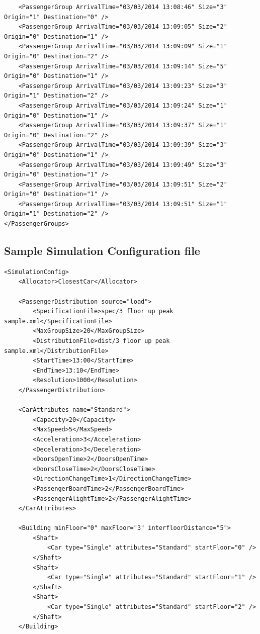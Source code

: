 \documentclass{UoYCSproject}
\begin{document}
\begin{appendices}
\begin{lstlisting}
	<PassengerGroup ArrivalTime="03/03/2014 13:08:46" Size="3" Origin="1" Destination="0" />
	<PassengerGroup ArrivalTime="03/03/2014 13:09:05" Size="2" Origin="0" Destination="1" />
	<PassengerGroup ArrivalTime="03/03/2014 13:09:09" Size="1" Origin="0" Destination="2" />
	<PassengerGroup ArrivalTime="03/03/2014 13:09:14" Size="5" Origin="0" Destination="1" />
	<PassengerGroup ArrivalTime="03/03/2014 13:09:23" Size="3" Origin="1" Destination="2" />
	<PassengerGroup ArrivalTime="03/03/2014 13:09:24" Size="1" Origin="0" Destination="1" />
	<PassengerGroup ArrivalTime="03/03/2014 13:09:37" Size="1" Origin="0" Destination="2" />
	<PassengerGroup ArrivalTime="03/03/2014 13:09:39" Size="3" Origin="0" Destination="1" />
	<PassengerGroup ArrivalTime="03/03/2014 13:09:49" Size="3" Origin="0" Destination="1" />
	<PassengerGroup ArrivalTime="03/03/2014 13:09:51" Size="2" Origin="0" Destination="1" />
	<PassengerGroup ArrivalTime="03/03/2014 13:09:51" Size="1" Origin="1" Destination="2" />
</PassengerGroups>
\end{lstlisting}

\subsection{Sample Simulation Configuration file}

\begin{lstlisting}
<SimulationConfig>
	<Allocator>ClosestCar</Allocator>
	
	<PassengerDistribution source="load">
		<SpecificationFile>spec/3 floor up peak sample.xml</SpecificationFile>
		<MaxGroupSize>20</MaxGroupSize>
		<DistributionFile>dist/3 floor up peak sample.xml</DistributionFile>
		<StartTime>13:00</StartTime>
		<EndTime>13:10</EndTime>
		<Resolution>1000</Resolution>
	</PassengerDistribution>
	
	<CarAttributes name="Standard">
		<Capacity>20</Capacity>
		<MaxSpeed>5</MaxSpeed>
		<Acceleration>3</Acceleration>
		<Deceleration>3</Deceleration>
		<DoorsOpenTime>2</DoorsOpenTime>
		<DoorsCloseTime>2</DoorsCloseTime>
		<DirectionChangeTime>1</DirectionChangeTime>
		<PassengerBoardTime>2</PassengerBoardTime>
		<PassengerAlightTime>2</PassengerAlightTime>
	</CarAttributes>
	
	<Building minFloor="0" maxFloor="3" interfloorDistance="5">
		<Shaft>
			<Car type="Single" attributes="Standard" startFloor="0" />
		</Shaft>
		<Shaft>
			<Car type="Single" attributes="Standard" startFloor="1" />
		</Shaft>
		<Shaft>
			<Car type="Single" attributes="Standard" startFloor="2" />
		</Shaft>
	</Building>
	

\end{lstlisting}
\end{appendices}
\end{document}
